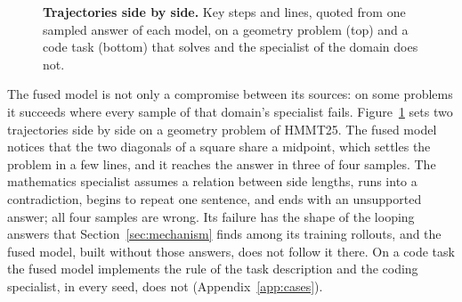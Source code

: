 \begin{figure}[t]
\vspace{5pt}

\vspace{4pt}
\begin{minipage}[t]{0.492\textwidth}
\end{minipage}\hfill
\begin{minipage}[t]{0.492\textwidth}
\end{minipage}
\caption{\textbf{Trajectories side by side.} Key steps and lines, quoted from
one sampled answer of each model, on a geometry problem (top) and a code
task (bottom) that \method solves and the specialist of the domain does not.}
\label{fig:cases}
\end{figure}

The fused model is not only a compromise between its sources: on some
problems it succeeds where every sample of that domain's specialist fails.
Figure~\ref{fig:cases} sets two trajectories side by side on a geometry
problem of HMMT25. The fused model notices that the two diagonals of a
square share a midpoint, which settles the problem in a few lines, and it
reaches the answer in three of four samples. The mathematics specialist
assumes a relation between side lengths, runs into a contradiction, begins to
repeat one sentence, and ends with an unsupported answer; all four samples
are wrong. Its failure has the shape of the looping answers that
Section~\ref{sec:mechanism} finds among its training rollouts, and the fused
model, built without those answers, does not follow it there. On a code
task the fused model implements the rule of the task description and the
coding specialist, in every seed, does not (Appendix~\ref{app:cases}).

